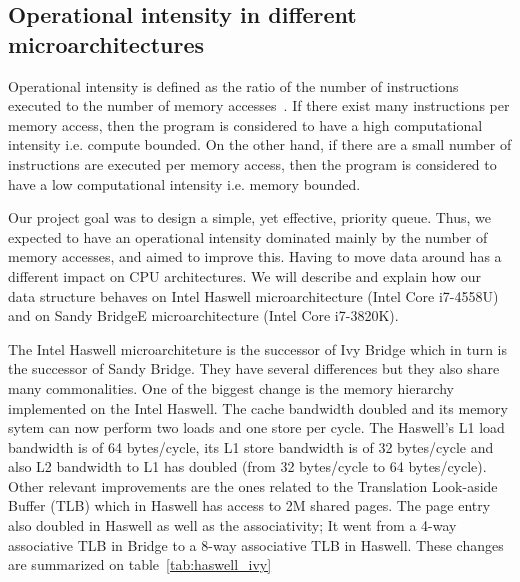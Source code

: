 \subsection{Operational intensity in different microarchitectures}
Operational intensity is defined as the ratio of the number of instructions executed to the number of memory accesses~\cite{roger1996science}. If there exist many instructions per memory access, then the program is considered to have a high computational intensity i.e. compute bounded. On the other hand, if there are a small number of instructions are executed per memory access, then the program is considered to have a low computational intensity i.e. memory bounded.

Our project goal was to design a simple, yet effective, priority queue. Thus, we expected to have an operational intensity dominated mainly by the number of memory accesses, and aimed to improve this. Having to move data around has a different impact on CPU architectures. We will describe and explain how our data structure behaves on Intel Haswell microarchitecture (Intel Core i7-4558U) and on Sandy BridgeE microarchitecture (Intel Core i7-3820K). 

The Intel Haswell microarchiteture is the successor of Ivy Bridge which in turn is the successor of Sandy Bridge. They have several differences but they also share many commonalities. One of the biggest change is the memory hierarchy implemented on the Intel Haswell. The cache bandwidth doubled and its memory sytem can now perform two loads and one store per cycle. The Haswell's L1 load bandwidth is of 64 bytes/cycle, its L1 store bandwidth is of 32 bytes/cycle and also L2 bandwidth to L1 has doubled (from 32 bytes/cycle to 64 bytes/cycle). Other relevant improvements are the ones related to the Translation Look-aside Buffer (TLB) which in Haswell has access to 2M shared pages. The page entry also doubled in Haswell as well as the associativity; It went from a 4-way associative TLB in 
 Bridge to a 8-way associative TLB in Haswell. These changes are summarized on table~\ref{tab:haswell_ivy}~\cite{ijcsit2013040321, microarchitecture, haswell_arch}

